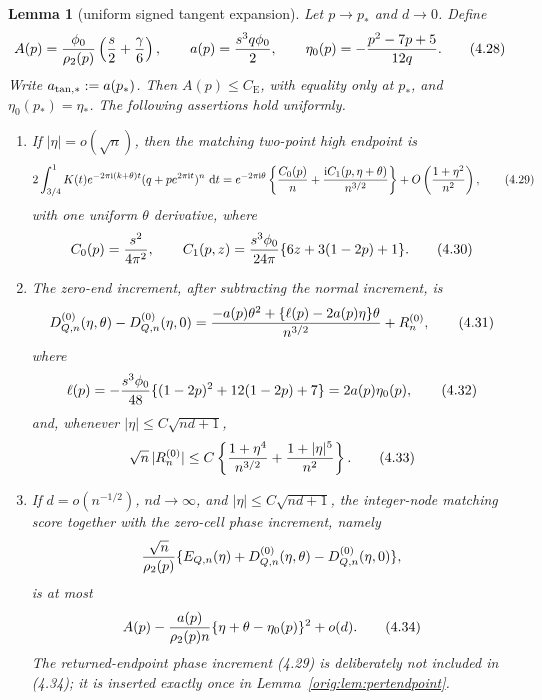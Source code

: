 \documentclass[11pt,a4paper]{article}
\numberwithin{equation}{section}
\newtheorem{lemma}[theorem]{Lemma}
\theoremstyle{definition}
\theoremstyle{remark}
\newcommand{\ii}{\mathrm i}
\newcommand{\dd}{\,\mathrm d}
\newcommand{\CE}{C_{\mathrm E}}
\begin{document}
\begin{lemma}[uniform signed tangent expansion]\label{orig:lem:tangentexp}
Let $p\to p_*$ and $d\to0$.  Define
\[
 A(p)={\phi_0\over\rho_2(p)}
       \left({s\over2}+{\gamma\over6}\right),\qquad
 a(p)={s^3q\phi_0\over2},\qquad
 \eta_0(p)=-{p^2-7p+5\over12q}.                       \tag{4.28}
\]
Write $a_{\rm tan,*}:=a(p_*)$.
Then $A(p)\le\CE$, with equality only at $p_*$, and
$\eta_0(p_*)=\eta_*$.  The following assertions hold uniformly.

\begin{enumerate}[label=(\alph*)]
\item If $|\eta|=o(\sqrt n)$, then the matching two-point high endpoint is
\[
 2\int_{3/4}^1K(t)e^{-2\pi\ii(k+\theta)t}
       (q+pe^{2\pi\ii t})^n\,\dd t
 =e^{-2\pi\ii\theta}\left\{{C_0(p)\over n}
 +{\ii C_1(p,\eta+\theta)\over n^{3/2}}\right\}
 +O\left({1+\eta^2\over n^2}\right),                  \tag{4.29}
\]
with one uniform $\theta$ derivative, where
\[
 C_0(p)={s^2\over4\pi^2},\qquad
 C_1(p,z)={s^3\phi_0\over24\pi}
              \{6z+3(1-2p)+1\}.                     \tag{4.30}
\]

\item The zero-end increment, after subtracting the normal increment, is
\[
 D^{(0)}_{Q,n}(\eta,\theta)-D^{(0)}_{Q,n}(\eta,0)
 ={ -a(p)\theta^2+\{\ell(p)-2a(p)\eta\}\theta
       \over n^{3/2}}+R^{(0)}_n,                       \tag{4.31}
\]
where
\[
 \ell(p)=-{s^3\phi_0\over48}\{(1-2p)^2+12(1-2p)+7\}
         =2a(p)\eta_0(p),                              \tag{4.32}
\]
and, whenever $|\eta|\le C\sqrt{nd+1}$,
\[
 \sqrt n\,|R^{(0)}_n|
 \le C\left\{{1+\eta^4\over n^{3/2}}
              +{1+|\eta|^5\over n^2}\right\}.        \tag{4.33}
\]

\item If $d=o(n^{-1/2})$, $nd\to\infty$, and
$|\eta|\le C\sqrt{nd+1}$, the integer-node matching score together with
the zero-cell phase increment, namely
\[
 {\sqrt n\over\rho_2(p)}\{E_{Q,n}(\eta)
       +D^{(0)}_{Q,n}(\eta,\theta)-D^{(0)}_{Q,n}(\eta,0)\},
\]
is at most
\[
 A(p)-{a(p)\over\rho_2(p)n}
       \{\eta+\theta-\eta_0(p)\}^2+o(d).              \tag{4.34}
\]
The returned-endpoint phase increment (4.29) is deliberately not included
in (4.34); it is inserted exactly once in Lemma~\ref{orig:lem:pertendpoint}.
\end{enumerate}
\end{lemma}
\end{document}
